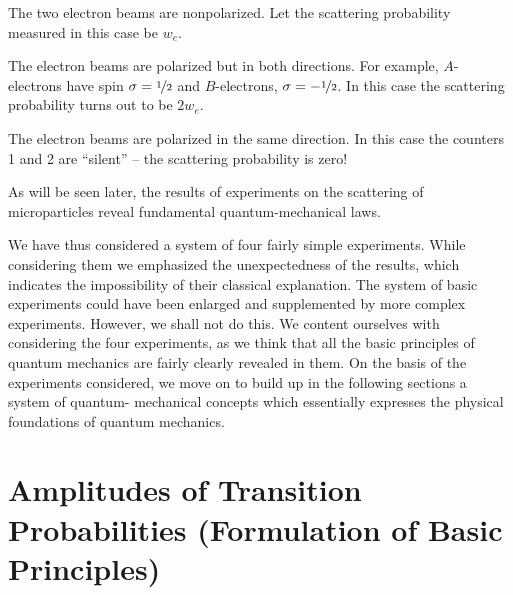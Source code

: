 \documentclass[a4paper,sfsidenotes,colorlinks=true]{tufte-book}
\numberwithin{equation}{section}
\numberwithin{figure}{section}
\begin{document}
\begin{description}[font=\bfseries, leftmargin=1cm]
\item[Fourth example.] The two electron beams are nonpolarized. Let the scattering probability measured in this case be $w_{e}$. 


\item[Fifth example.] The electron beams are polarized but in both
  directions. For example, $A$-electrons have spin $\sigma =
  \nicefrac{1}{2}$ and $B$-electrons, $\sigma = - \nicefrac{1}{2}$. In
  this case the scattering probability turns out to be $2w_{e}$.


\item[Sixth example.] The electron beams are polarized in the same
  direction. In this case the counters \textsf{1} and \textsf{2} are
  ``silent'' -- the scattering probability is zero! 
\end{description}
As will be seen later, the results of experiments on the scattering of microparticles reveal fundamental quantum-mechanical laws.


We  have thus considered a system of four fairly simple experiments. While considering them we emphasized the unexpectedness of the results, which indicates the impossibility of their classical explanation. The system of basic experiments could have been enlarged and supplemented by more complex experiments. However, we shall not do this. We content ourselves with considering the four experiments, as we think that all the basic principles of quantum mechanics are fairly clearly revealed in them. On the basis of the experiments considered, we move on to build up in the following sections a system of quantum- mechanical concepts which essentially expresses the physical foundations of quantum mechanics.

\section{Amplitudes of Transition Probabilities (Formulation of Basic Principles)}
\label{sec-08}
\end{document}
